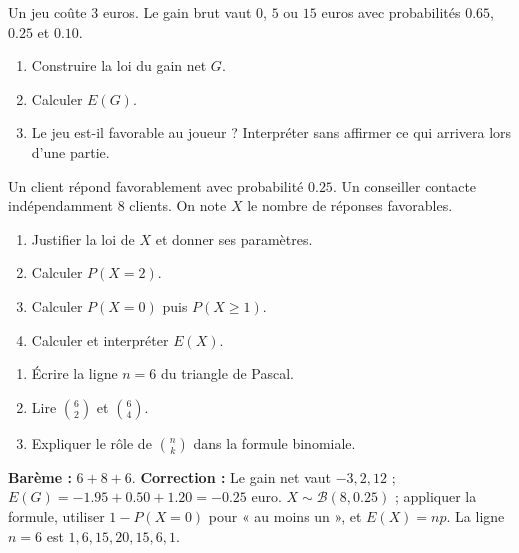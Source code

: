 \begin{exercise}
Un jeu coûte $3$ euros. Le gain brut vaut $0$, $5$ ou $15$ euros avec probabilités $\num{0,65}$, $\num{0,25}$ et $\num{0,10}$.
\begin{enumerate}
\item Construire la loi du gain net $G$.
\item Calculer $E(G)$.
\item Le jeu est-il favorable au joueur ? Interpréter sans affirmer ce qui arrivera lors d'une partie.
\end{enumerate}
\end{exercise}
\begin{exercise}
Un client répond favorablement avec probabilité $\num{0,25}$. Un conseiller contacte indépendamment $8$ clients. On note $X$ le nombre de réponses favorables.
\begin{enumerate}
\item Justifier la loi de $X$ et donner ses paramètres.
\item Calculer $P(X=2)$.
\item Calculer $P(X=0)$ puis $P(X\geq1)$.
\item Calculer et interpréter $E(X)$.
\end{enumerate}
\end{exercise}
\begin{exercise}
\begin{enumerate}
\item Écrire la ligne $n=6$ du triangle de Pascal.
\item Lire $\binom62$ et $\binom64$.
\item Expliquer le rôle de $\binom nk$ dans la formule binomiale.
\end{enumerate}
\end{exercise}
\begin{solution}\textbf{Barème :} $6+8+6$. \textbf{Correction :} Le gain net vaut $-3,2,12$ ; $E(G)=-\num{1,95}+\num{0,50}+\num{1,20}=-\num{0,25}$ euro. $X\sim\mathcal B(8,\num{0,25})$ ; appliquer la formule, utiliser $1-P(X=0)$ pour « au moins un », et $E(X)=np$. La ligne $n=6$ est $1,6,15,20,15,6,1$.\end{solution}
